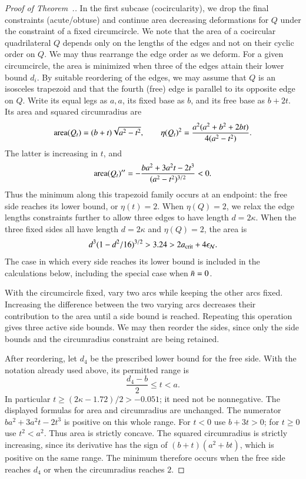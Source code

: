 \begin{proof}[Proof of Theorem~.]
In the first subcase (cocircularity), we drop the final constraints
(acute/obtuse) and continue area decreasing deformations for $Q$ under
the constraint of a fixed circumcircle.  We note that the area of a
cocircular quadrilateral $Q$ depends only on the lengths of the edges
and not on their cyclic order on $Q$.  We may thus rearrange the edge
order as we deform.  For a given circumcircle, the area is minimized
when three of the edges attain their lower bound $d_i$.  By suitable
reordering of the edges, we may assume that $Q$ is an isosceles
trapezoid and that the fourth (free) edge is parallel to its opposite
edge on $Q$.  Write its equal legs as $a,a$,
its fixed base as $b$, and its free base as $b+2t$.
Its area and squared
circumradius are
\[
{\operatorname{area}}(Q_t)=(b+t)\sqrt{a^2-t^2},\qquad
\eta(Q_t)^2=\frac{a^2(a^2+b^2+2bt)}{4(a^2-t^2)}.
\]
The latter is increasing in $t$, and
\[
{\operatorname{area}}(Q_t)''=-\frac{ba^2+3a^2t-2t^3}{(a^2-t^2)^{3/2}}<0.
\]
Thus the minimum along this trapezoid family occurs at an endpoint:
the free side reaches its lower bound, or $\eta(t)=2$.  When
$\eta(Q)=2$, we relax the edge lengths constraints further to allow
three edges to have length $d=2\kappa$.
When the three fixed sides all have length $d=2\kappa$ and
$\eta(Q)=2$, the area is
\[
d^3(1-d^2/16)^{3/2}>3.24>2a_\text{crit}+4\epsilon_{\mathcal N}.
\]
The case in which every side reaches its lower bound is included
in the calculations below, including the special case when $\bar n=0$.

With the circumcircle fixed, vary two arcs while keeping
the other arcs fixed. Increasing the difference between the two
varying arcs decreases their contribution to the area until a side
bound is reached. Repeating this operation gives three active side
bounds. We may then reorder the sides, since only the side bounds
and the circumradius constraint are being retained.

After reordering, let $d_4$ be the prescribed lower bound for the free side. With
the notation already used above, its permitted range is
\[
\frac{d_4-b}{2}\le t<a.
\]
In particular $t\ge(2\kappa-1.72)/2>-0.051$; it need not be
nonnegative. The displayed formulas for area and circumradius are
unchanged. The numerator $ba^2+3a^2t-2t^3$ is positive on this
whole range. For $t<0$ use $b+3t>0$; for $t\ge0$ use $t^2<a^2$.
Thus area is strictly concave. The squared circumradius is strictly
increasing, since its derivative has the sign of
$(b+t)(a^2+bt)$, which is positive on the same range.
The minimum therefore occurs when the free side reaches $d_4$ or
when the circumradius reaches $2$.


\end{proof}

